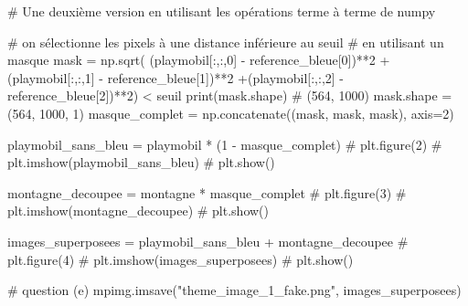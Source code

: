 \documentclass[10pt,fleqn]{article} %
\begin{document}
\begin{multicols}{2}
\begin{corrige}
\begin{python}
# Une deuxième version en utilisant les opérations terme à terme de numpy

# on sélectionne les pixels à une distance inférieure au seuil
# en utilisant un masque
mask = np.sqrt( (playmobil[:,:,0] - reference_bleue[0])**2
               +(playmobil[:,:,1] - reference_bleue[1])**2
               +(playmobil[:,:,2] - reference_bleue[2])**2) < seuil
print(mask.shape)
# (564, 1000)
mask.shape = (564, 1000, 1)
masque_complet = np.concatenate((mask, mask, mask), axis=2)

playmobil_sans_bleu = playmobil * (1 - masque_complet)
# plt.figure(2)
# plt.imshow(playmobil_sans_bleu)
# plt.show()

montagne_decoupee = montagne * masque_complet
# plt.figure(3)
# plt.imshow(montagne_decoupee)
# plt.show()

images_superposees = playmobil_sans_bleu + montagne_decoupee
# plt.figure(4)
# plt.imshow(images_superposees)
# plt.show()

# question (e)
mpimg.imsave("theme_image_1_fake.png", images_superposees)
\end{python}
\end{corrige}
\else
\fi


\ifprof
\else
\end{multicols}
\fi
\end{document}
